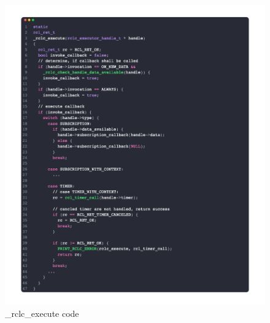\subsubsection{}
\begin{figure}[htbp!]
    \centering
    \includegraphics[width=1\linewidth]{Img/code/rclc/_rclc_execute.png}
    \caption{\_rclc\_execute code}
    \vspace{-0.1in}
\end{figure}